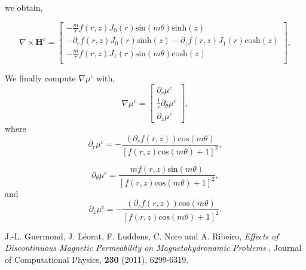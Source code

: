 \documentclass[11pt]{amsart}
\begin{document}
\noindent we obtain,

\begin{equation}
\nabla \times \mathbf{H}^c=
\left[ \begin{array}{c}
-\frac{m}{r}f(r,z)J_0(r)\text{sin}(m \theta)\text{sinh}(z) \\ 
-\partial _r f(r,z) J_0(r)   \text{sinh}(z)  
-\partial _z f(r,z) J_1(r)    \text{cosh}(z) \\
 -\frac{m}{r}f(r,z)J_1(r)\text{sin}(m \theta)\text{cosh}(z) \\ 

\end{array} \right],
\end{equation}



 \noindent We finally compute $\nabla \mu ^c$ with, 
 $$
\nabla \mu ^c =\left[ \begin{array}{c} \partial _r \mu^c   \\ \frac{1}{r} \partial _{\theta} \mu^c  \\ \partial _z \mu^c \end{array} \right],
$$
\noindent where
$$
\partial _r \mu^c = -\frac{(\partial _r f(r,z)) \text{cos}(m \theta)}{[f(r,z)\text{cos}(m \theta)+1]^2},
$$


$$
\partial _{\theta} \mu^c = \frac{m f(r,z) \text{sin}(m \theta)}{[f(r,z)\text{cos}(m \theta)+1]^2},
$$
\noindent and
$$
\partial _z \mu^c = -\frac{(\partial _z f(r,z)) \text{cos}(m \theta)}{[f(r,z)\text{cos}(m \theta)+1]^2}.
$$







\newpage
\begin{thebibliography}{9}
 J.-L. Guermond, J. L\' eorat, F. Luddens, C. Nore and A. Ribeiro,
{\it Effects of Discontinuous Magnetic Permeability on Magnetohydronamic Problems }, 
Journal of Computational Physics, {\bf 230} (2011), 6299-6319.
\end{thebibliography}
\end{document}
